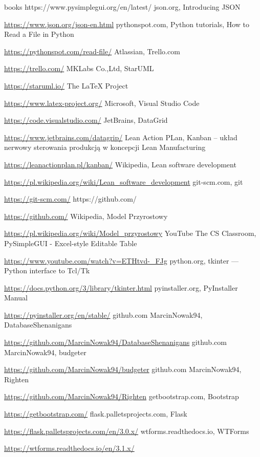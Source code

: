 \documentclass[a4paper,10pt, twoside]{report}
\begin{document}
\begin{thebibliography} {books}
{        https://www.pysimplegui.org/en/latest/}
     json.org, Introducing JSON \raggedright\url{
        https://www.json.org/json-en.html}
     pythonspot.com, Python tutorials, How to Read a File in Python \raggedright\url{
        https://pythonspot.com/read-file/}
     Atlassian, Trello.com \raggedright\url{
        https://trello.com/}
     MKLabs Co.,Ltd, StarUML \raggedright\url{
        https://staruml.io/}
     The LaTeX Project \raggedright\url{
        https://www.latex-project.org/}
     Microsoft, Visual Studio Code \raggedright\url{
        https://code.visualstudio.com/}
     JetBrains, DataGrid \raggedright\url{
        https://www.jetbrains.com/datagrip/}
     Lean Action PLan, Kanban – układ nerwowy sterowania produkcją w koncepcji Lean Manufacturing \raggedright\url{
        https://leanactionplan.pl/kanban/}
     Wikipedia, Lean software development \raggedright\url{
        https://pl.wikipedia.org/wiki/Lean_software_development}
     git-scm.com, git \raggedright\url{
        https://git-scm.com/}
     https://github.com/ \raggedright\url{
        https://github.com/}
     Wikipedia, Model Przyrostowy \raggedright\url{
        https://pl.wikipedia.org/wiki/Model_przyrostowy}
     YouTube The CS Classroom, PySimpleGUI - Excel-style Editable Table \raggedright\url{
        https://www.youtube.com/watch?v=ETHtvd-_FJg}
     python.org, tkinter — Python interface to Tcl/Tk \raggedright\url{
        https://docs.python.org/3/library/tkinter.html}
     pyinstaller.org, PyInstaller Manual \raggedright\url{
        https://pyinstaller.org/en/stable/}
     github.com MarcinNowak94, DatabaseShenanigans \raggedright\url{
        https://github.com/MarcinNowak94/DatabaseShenanigans}
     github.com MarcinNowak94, budgeter \raggedright\url{
        https://github.com/MarcinNowak94/budgeter}
     github.com MarcinNowak94, Righten \raggedright\url{
        https://github.com/MarcinNowak94/Righten}
     getbootstrap.com, Bootstrap \raggedright\url{
        https://getbootstrap.com/}
     flask.palletsprojects.com, Flask \raggedright\url{
        https://flask.palletsprojects.com/en/3.0.x/}
     wtforms.readthedocs.io, WTForms \raggedright\url{
        https://wtforms.readthedocs.io/en/3.1.x/}

\end{thebibliography}
\end{document}
